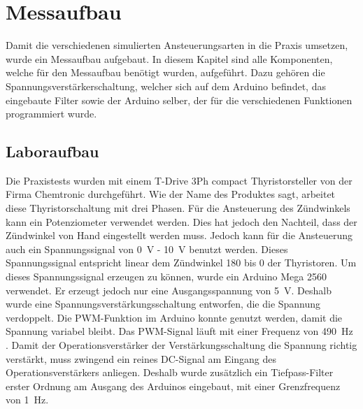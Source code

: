 \section{Messaufbau}
Damit die verschiedenen simulierten Ansteuerungsarten in die Praxis umsetzen, wurde ein Messaufbau aufgebaut. In diesem Kapitel sind alle Komponenten, welche für den Messaufbau benötigt wurden, aufgeführt. Dazu gehören die Spannungsverstärkerschaltung, welcher sich auf dem Arduino befindet, das eingebaute Filter sowie der Arduino selber, der für die verschiedenen Funktionen programmiert wurde.
\subsection{Laboraufbau}
Die Praxistests wurden mit einem \grqq T-Drive 3Ph compact Thyristorsteller\grqq \hspace{0.02cm} von der Firma Chemtronic durchgeführt. Wie der Name des Produktes sagt, arbeitet diese Thyristorschaltung mit drei Phasen. Für die Ansteuerung des Zündwinkels kann ein Potenziometer verwendet werden. Dies hat jedoch den Nachteil, dass der Zündwinkel von Hand eingestellt werden muss. Jedoch kann für die Ansteuerung auch ein Spannungssignal von \SI{0}{V} - \SI{10}{V} benutzt werden. Dieses Spannungssignal entspricht linear dem Zündwinkel 180\textdegree \hspace{0.02cm} bis 0\textdegree \hspace{0.02cm} der Thyristoren. Um dieses Spannungssignal erzeugen zu können, wurde ein Arduino Mega 2560 verwendet. Er erzeugt jedoch nur eine Ausgangsspannung von \SI{5}{V}. Deshalb wurde eine Spannungsverstärkungsschaltung entworfen, die die Spannung verdoppelt. Die PWM-Funktion im Arduino konnte genutzt werden, damit die Spannung variabel bleibt. Das PWM-Signal läuft mit einer Frequenz von \SI{490}{Hz} \cite{Arduino_PWM}. 
Damit der Operationsverstärker der Verstärkungsschaltung die Spannung richtig verstärkt, muss zwingend ein reines DC-Signal am Eingang des Operationsverstärkers anliegen. Deshalb wurde zusätzlich ein Tiefpass-Filter erster Ordnung am Ausgang des Arduinos eingebaut, mit einer Grenzfrequenz von \SI{1}{Hz}.  



